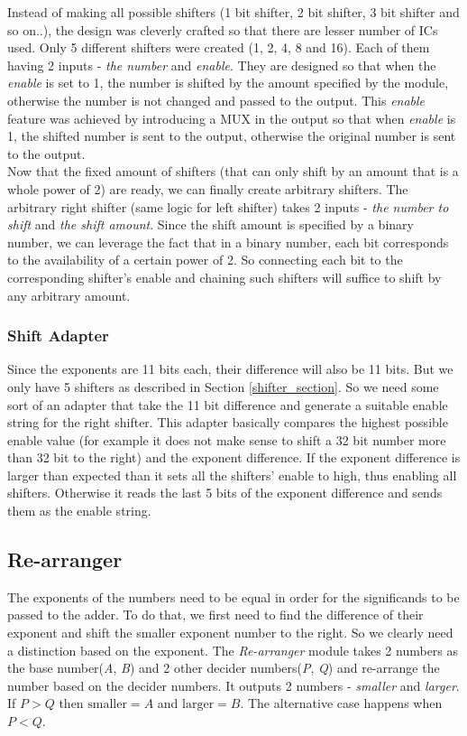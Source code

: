 \documentclass[14pt]{article}
\begin{document}
Instead of making all possible shifters (1 bit shifter, 2 bit shifter, 3 bit shifter and so on..), the design was cleverly crafted so that there are lesser number of ICs used. Only 5 different shifters were created (1, 2, 4, 8 and 16). Each of them having 2 inputs - \textit{the number} and \textit{enable}. They are designed so that when the \textit{enable} is set to 1, the number is shifted by the amount specified by the module, otherwise the number is not changed and passed to the output. This \textit{enable} feature was achieved by introducing a MUX in the output so that when \textit{enable} is 1, the shifted number is sent to the output, otherwise the original number is sent to the output.\\

Now that the fixed amount of shifters (that can only shift by an amount that is a whole power of 2) are ready, we can finally create arbitrary shifters. The arbitrary right shifter (same logic for left shifter) takes 2 inputs - \textit{the number to shift} and \textit{the shift amount}. Since the shift amount is specified by a binary number, we can leverage the fact that in a binary number, each bit corresponds to the availability of a certain power of 2. So connecting each bit to the corresponding shifter's enable and chaining such shifters will suffice to shift by any arbitrary amount.

\subsubsection{Shift Adapter}
Since the exponents are 11 bits each, their difference will also be 11 bits. But we only have 5 shifters as described in Section \ref{shifter_section}. So we need some sort of an adapter that take the 11 bit difference and generate a suitable enable string for the right shifter. This adapter basically compares the highest possible enable value (for example it does not make sense to shift a 32 bit number more than 32 bit to the right) and the exponent difference. If the exponent difference is larger than expected than it sets all the shifters' enable to high, thus enabling all shifters. Otherwise it reads the last 5 bits of the exponent difference and sends them as the enable string.

\subsection{Re-arranger}
The exponents of the numbers need to be equal in order for the significands to be passed to the adder. To do that, we first need to find the difference of their exponent and shift the smaller exponent number to the right. So we clearly need a distinction based on the exponent. The \textit{Re-arranger} module takes 2 numbers as the base number(\textit{A}, \textit{B}) and 2 other decider numbers(\textit{P}, \textit{Q}) and re-arrange the number based on the decider numbers. It outputs 2 numbers - \textit{smaller} and \textit{larger}. If $P > Q$ then $\textrm{smaller} = A$ and $\textrm{larger} = B$. The alternative case happens when $P < Q$.\\
\end{document}
